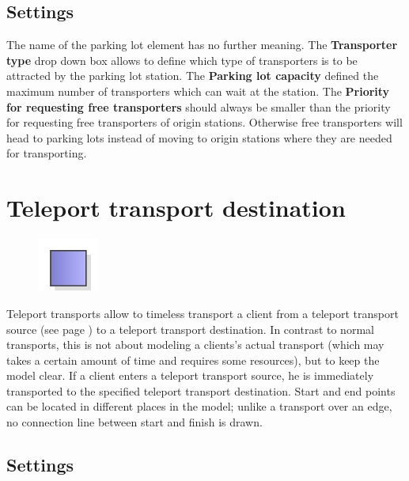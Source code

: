 \subsection*{Settings}

The name of the parking lot element has no further meaning.
The \textbf{Transporter type} drop down box allows to define which
type of transporters is to be attracted by the parking lot station.
The \textbf{Parking lot capacity} defined the maximum number of
transporters which can wait at the station. The
\textbf{Priority for requesting free transporters} should always be
smaller than the priority for requesting free transporters of
origin stations. Otherwise free transporters will head to parking
lots instead of moving to origin stations where they are needed
for transporting.


\section{Teleport transport destination}
\label{ref:ModelElementTeleportDestination}

\begin{figure}
\vspace{-22pt}
\includegraphics[width=2cm]{imageModelElementTeleportDestination.png}
\vspace{-22pt}
\end{figure}

Teleport transports allow to timeless transport a client from a 
teleport transport source (see page \pageref{ref:ModelElementTeleportSource}) 
to a teleport transport destination.
In contrast to normal transports, this is not about modeling a clients's actual transport
(which may takes a certain amount of time and requires some resources), but to keep the model clear.
If a client enters a teleport transport source, he is immediately transported to the specified
teleport transport destination. Start and end points can be located in different places in the model;
unlike a transport over an edge, no connection line between start and finish is drawn.

\subsection*{Settings}

